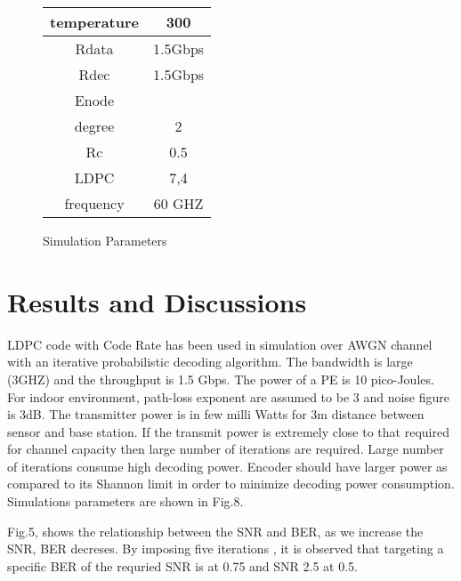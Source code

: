 \documentclass[3p,times,procedia]{elsarticle}
\begin{document}
\begin{figure}[!ht]
\begin{minipage}{0.49\linewidth}
\begin{tabular}{|c|c|}
temperature &        300 \\
\hline

     Rdata &    1.5Gbps \\
\hline

      Rdec &    1.5Gbps \\
\hline

     Enode &     \\
\hline

    degree &          2 \\
\hline

        Rc &        0.5 \\
\hline

      LDPC &        7,4 \\
\hline

 frequency &     60 GHZ \\
\hline
\end{tabular}

\setlength{\hoffset}{-2cm}
\caption{Simulation Parameters}

    \end{minipage}
  \end{figure}







\vspace{-1cm}
\section{Results and Discussions}
\label{sec:typestyle}
\vspace{-0.3cm}

LDPC code with Code Rate  has been used in simulation over AWGN channel with an iterative probabilistic decoding algorithm.
The bandwidth is large (3GHZ) and the throughput is 1.5 Gbps. The power of a PE is 10 pico-Joules. For indoor environment, path-loss exponent are assumed to be 3 and noise figure is 3dB. The transmitter power is in few milli Watts for 3m distance between sensor and base station. If the transmit power  is extremely close to that required for channel capacity then large number of iterations  are required. Large number of iterations consume high decoding power. Encoder should have larger power as compared to its Shannon limit in order to minimize decoding power consumption. Simulations parameters are shown in Fig.8.





Fig.5, shows the relationship between the SNR and BER, as we increase the SNR, BER decreses. By imposing five iterations , it is observed that targeting a specific BER of  the requried SNR is  at  0.75 and SNR 2.5 at  0.5.
\end{document}
